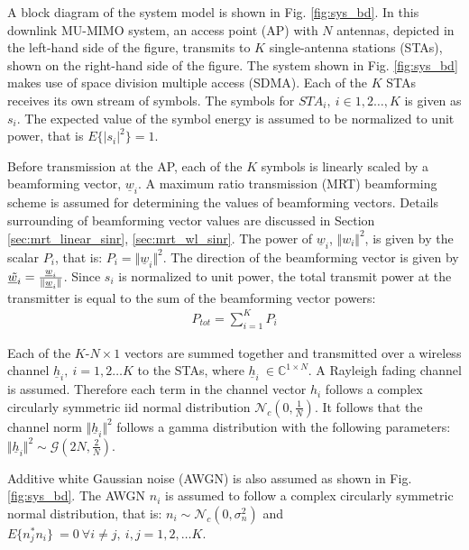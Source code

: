 A block diagram of the system model is shown in Fig. \ref{fig:sys_bd}. In this downlink MU-MIMO system, an access point (AP) with $N$ antennas, depicted in the left-hand side of the figure, transmits to $K$ single-antenna stations (STAs), shown on the right-hand side of the figure. The system shown in Fig. \ref{fig:sys_bd} makes use of space division multiple access (SDMA). Each of the $K$ STAs receives its own stream of symbols. The symbols for $STA_i,\ i\in 1,2\ldots,K$ is given as $s_i$. The expected value of the symbol energy is assumed to be normalized to unit power, that is $E \lbrace \vert s_i \vert^2 \rbrace = 1$. 

Before transmission at the AP, each of the $K$ symbols is linearly scaled by a beamforming vector, $\underline w_i$. A maximum ratio transmission (MRT) beamforming scheme is assumed for determining the values of beamforming vectors. Details surrounding of beamforming vector values are discussed in Section \ref{sec:mrt_linear_sinr}, \ref{sec:mrt_wl_sinr}. The power of $\underline w_i$, $\Vert w_i \Vert^2$, is given by the scalar $P_i$, that is: $P_i = \Vert \underline w_i \Vert^2$. The direction of the beamforming vector is given by $\Tilde{\underline w_i}=\frac{\underline w_i}{\Vert \underline w_i \Vert}$. Since $s_i$ is normalized to unit power, the total transmit power at the transmitter is equal to the sum of the beamforming vector powers:
  \begin{equation}
     \begin{aligned}\label{eq:total_power_sum}
     P_{tot} = \sum_{i=1}^K P_i
     \end{aligned}
 \end{equation}


Each of the $K$-$N \times 1$ vectors are summed together and transmitted over a wireless channel $\underline h_i,\ i= 1,2\ldots K$ to the STAs, where $\underline h_i\ \in \mathbb{C}^{1 \times N}$. A Rayleigh fading channel is assumed. Therefore each term in the channel vector $h_i$ follows a complex circularly symmetric iid normal distribution $\mathcal{N}_c(0,\frac{1}{N})$. It follows that the channel norm $\Vert \underline h_i \Vert^2$ follows a gamma distribution with the following parameters: $\Vert \underline h_i \Vert^2 \sim \mathcal{G}(2N,\frac{2}{N})$.

Additive white Gaussian noise (AWGN) is also assumed as shown in Fig. \ref{fig:sys_bd}. The AWGN $n_i$ is assumed to follow a complex circularly symmetric normal distribution, that is: $n_i \sim \mathcal{N}_c(0,\sigma_n^2)$ and $E \lbrace n_j^* n_i \rbrace\ = 0\ \forall i \neq j,\ i,j=1,2,\ldots K$.

